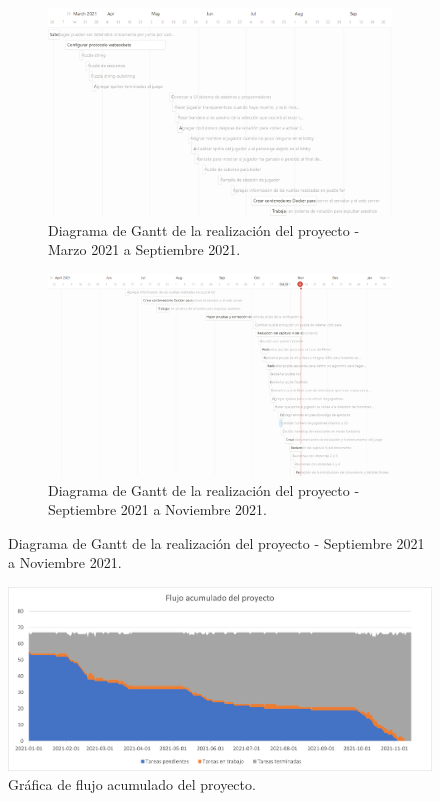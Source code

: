 \begin{figure}
    \ContinuedFloat
    \centering
    \caption{Diagrama de Gantt del proyecto.}
    \label{fig:diagrama_gantt}
         \begin{subfigure}{\textwidth}
        \centering
        \includegraphics[width=0.8\linewidth]{images/mar-sep-21.png}
        \caption{Diagrama de Gantt de la realización del proyecto - Marzo 2021 a Septiembre 2021.}
        \label{fig:gantt_proyecto_2}
    \end{subfigure}
    \begin{subfigure}{\textwidth}\ContinuedFloat
        \centering
        \includegraphics[width=0.8\linewidth]{images/sep-nov-21.png}
        \caption{Diagrama de Gantt de la realización del proyecto - Septiembre 2021 a Noviembre 2021.}
        \label{fig:gantt_proyecto_3}
     \end{subfigure}
\end{figure}
\begin{figure}[H]
    \centering
    \includegraphics[width=0.8\linewidth]{images/BurndownChart.png}
    \caption{Gráfica de flujo acumulado del proyecto.}
    \label{fig:grafica_flujo_acumulado}
\end{figure}
